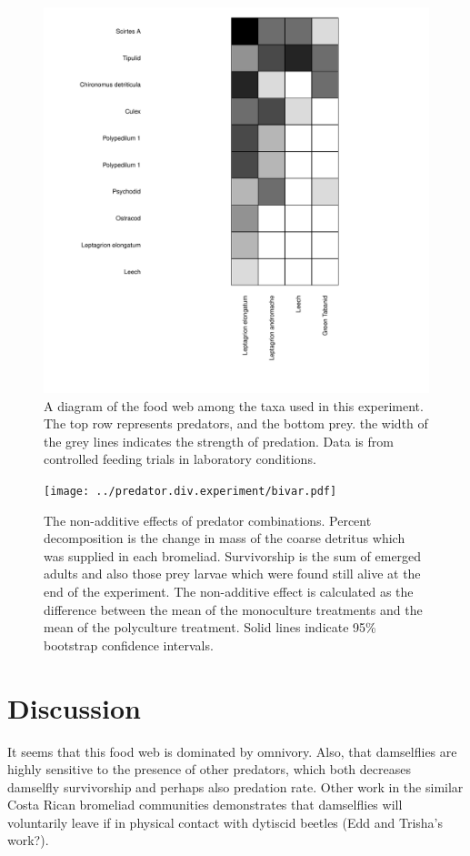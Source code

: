 \documentclass[10pt]{article}
\begin{document}
\begin{spacing}{2}
\begin{figure}
  \centering
  \includegraphics{../figures/foodwebVisweb.pdf}
  \caption{A diagram of the food web among the taxa used in this
experiment. The top row represents predators, and the bottom prey.
the width of the grey lines indicates the strength of predation. Data
is from controlled feeding trials in laboratory conditions.}
\label{fig:foodweb}
\end{figure}


\begin{figure}
  \centering
  \texttt{[image: ../predator.div.experiment/bivar.pdf]}
  \caption{The non-additive effects of predator combinations. Percent
    decomposition is the change in mass of the coarse detritus which
    was supplied in each bromeliad.  Survivorship is the sum of
    emerged adults and also those prey larvae which were found still
    alive at the end of the experiment.  The non-additive effect is
    calculated as the difference between the mean of the monoculture
    treatments and the mean of the polyculture treatment. Solid lines
    indicate 95\% bootstrap confidence intervals.}
\label{fig:prednonadd}
\end{figure}


\section{Discussion}

It seems that this food web is dominated by omnivory.  Also, that
damselflies are highly sensitive to the presence of other predators,
which both decreases damselfly survivorship and perhaps also predation
rate.  Other work in the similar Costa Rican bromeliad communities
demonstrates that damselflies will voluntarily leave if in physical
contact with dytiscid beetles (Edd and Trisha's work?).

\end{spacing}

 
\end{document}
